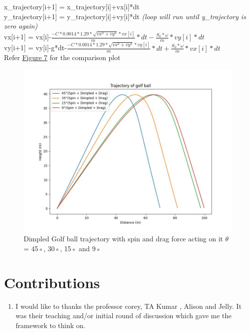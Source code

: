\documentclass[11pt]{article}
\begin{document}
\begin{justify}
\begin{raggedright}
\begin{justify}
x\_trajectory[i+1] = x\_trajectory[i]+vx[i]*dt\\
y\_trajectory[i+1] = y\_trajectory[i]+vy[i]*dt \textit{(loop will run until y\_trajectory is zero again)}\\
vx[i+1] = vx[i]-$\frac{-C*0.0014*1.29*\sqrt{vx^2+vy^2}*vx[i]}{m}*dt - \frac{S_0 * \omega}{m}*vy[i]*dt$\\
vy[i+1] = vy[i]-g*dt-$\frac{-C*0.0014*1.29*\sqrt{vx^2+vy^2}*vy[i]}{m}*dt + \frac{S_0 * \omega}{m}*vx[i]*dt$\\
Refer \hyperref[fig:Spin_Dimpled_Fdrag_trajectory]{Figure 7} for the comparison plot
\end{justify}
\end{raggedright}
\begin{figure}[b]
    \centering
    \includegraphics[width=\textwidth, height=\textheight, keepaspectratio]{Golf_Trajectory_Spin_Dimpled_drag.jpeg}
    \caption{Dimpled Golf ball trajectory with spin and drag force acting on it $\theta$ = 45◦, 30◦, 15◦ and 9◦}
    \label{fig:Spin_Dimpled_Fdrag_trajectory}
\end{figure}

\section{Contributions}
\begin{enumerate}
    \item I would like to thanks the professor corey, TA Kumar , Alison and Jelly. It was their  teaching and/or initial round of discussion which gave me the framework to think on.
\end{enumerate}

\end{justify}  
\end{document}
